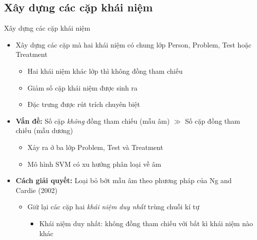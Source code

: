\subsection*{Xây dựng các cặp khái niệm}
\begin{frame}{Xây dựng các cặp khái niệm}
\putlogo
\begin{itemize}
	\item Xây dựng các cặp mà hai khái niệm có chung lớp Person, Problem, Test hoặc Treatment
	\begin{itemize}
		\item Hai khái niệm khác lớp thì không đồng tham chiếu
		\item Giảm số cặp khái niệm được sinh ra
		\item Đặc trưng được rút trích chuyên biệt
	\end{itemize}
	\item \textbf{Vấn đề:} Số cặp \emph{không} đồng tham chiếu (mẫu âm) $\gg$ Số cặp đồng tham chiếu (mẫu dương)
	\begin{itemize}
		\item Xảy ra ở ba lớp Problem, Test và Treatment
		\item Mô hình SVM có xu hướng phân loại về âm
	\end{itemize}
	\item \textbf{Cách giải quyết:} Loại bỏ bớt mẫu âm theo phương pháp của Ng and Cardie (2002)
	\begin{itemize}
		\item Giữ lại các cặp hai \emph{khái niệm duy nhất} trùng chuỗi kí tự
		\begin{itemize}
			\item Khái niệm duy nhất: không đồng tham chiếu với bất kì khái niệm nào khác
		\end{itemize}
	\end{itemize}
\end{itemize}
\end{frame}

